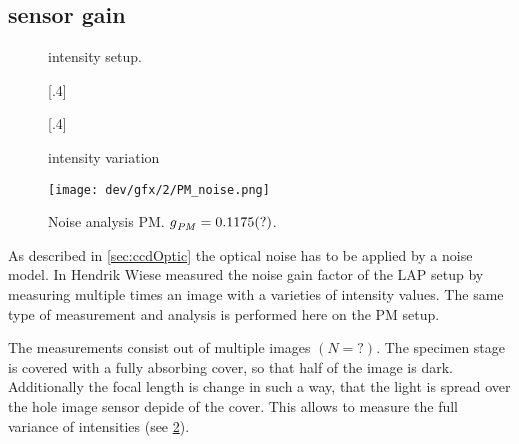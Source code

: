 \subsection{sensor gain}
%
\begin{figure}[!t]
\centering
\def\tikzwidth{0.75\textwidth}
\caption[intensity setup]{intensity setup. }
\label{fig:intensityFocus}
\end{figure}
% 
\begin{figure}[!t]
\centering
% 
[.4\textwidth]{
% 
}
% 
[.4\textwidth]{
}
% 
\caption[intensity image]{intensity variation}
\label{fig:intensityImage}
\end{figure}
% 
% 
\begin{figure}[!t]
\centering
\texttt{[image: dev/gfx/2/PM\_noise.png]}
\caption[Noise analysis]{Noise analysis PM. $\textnormal{$g$}_{\mathit{PM}} = \SI{0.1175}{}(?)$. }
\label{fig:parameterModelSimGain}
\end{figure}
% 
As described in \cref{sec:ccdOptic} the optical noise has to be applied by a noise model.
In \cite{Wiese:887678} Hendrik Wiese measured the noise gain factor of the \ac{LAP} setup by measuring multiple times an image with a varieties of intensity values.
The same type of measurement and analysis is performed here on the \ac{PM} setup.

The measurements consist out of multiple images $(N=?)$. The specimen stage is covered with a fully absorbing cover, so that half of the image is dark.
Additionally the focal length is change in such a way, that the light is spread over the hole image sensor depide of the cover.
This allows to measure the full variance of intensities (see \cref{fig:intensityImage}).

